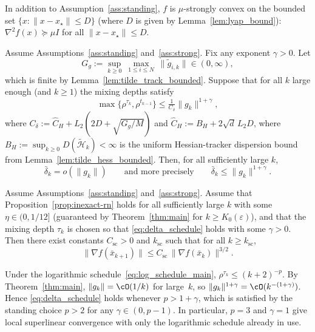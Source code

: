 \documentclass[review,onefignum,onetabnum]{siamart171218}
\begin{document}
\begin{assumption}\label{ass:strong}
In addition to Assumption~\ref{ass:standing}, $f$ is $\mu$-strongly convex on the bounded set
$\{x:\|x-x_\star\|\le D\}$ (where $D$ is given by Lemma~\ref{lem:lyap_bound}):
$\nabla^2 f(x)\succeq \mu I$ for all $\|x-x_\star\|\le D$.
\end{assumption}

\begin{lemma}\label{lem:delta_o_g}
Assume Assumptions~\ref{ass:standing} and~\ref{ass:strong}.
Fix any exponent $\gamma>0$.
Let
\[
G_g:=\sup_{k\ge 0}\ \max_{1\le i\le N}\ \|\tilde g_{i,k}\|\in(0,\infty),
\]
which is finite by Lemma~\ref{lem:tilde_track_bounded}.
Suppose that for all $k$ large enough (and $k\ge 1$) the mixing depths satisfy
\begin{equation}\label{eq:delta_schedule}
\max\{\rho^{\tau_k},\rho^{t_{k-1}}\}\le \tfrac{1}{C_\delta}\|g_k\|^{1+\gamma},
\end{equation}
where $C_\delta:=\hat C_H+L_2(2D+\sqrt{G_g/M})$ and $\hat C_H:=B_H+2\sqrt{d}\,L_2D$,
where $B_H:=\sup_{k\ge0}D(\tilde{\mathcal H}_k)<\infty$
is the uniform Hessian-tracker dispersion bound from Lemma~\ref{lem:tilde_hess_bounded}.
Then, for all sufficiently large $k$,
\[
\bar\delta_k = o(\|g_k\|)\qquad\text{and more precisely}\qquad \bar\delta_k\le \|g_k\|^{1+\gamma}.
\]
\end{lemma}

\begin{theorem}\label{thm:superlinear}
Assume Assumptions~\ref{ass:standing} and~\ref{ass:strong}.
Assume that Proposition~\ref{prop:inexact-rn} holds for all sufficiently large $k$ with some $\eta\in(0,1/12]$
(guaranteed by Theorem~\ref{thm:main} for $k\ge K_0(\varepsilon)$),
and that the mixing depth $\tau_k$ is chosen so that \eqref{eq:delta_schedule} holds with some $\gamma>0$.
Then there exist constants $C_{\mathrm{sc}}>0$ and $k_{\mathrm{sc}}$ such that for all $k\ge k_{\mathrm{sc}}$,
\[
\|\nabla f(\bar x_{k+1})\|\le C_{\mathrm{sc}}\,\|\nabla f(\bar x_k)\|^{3/2}.
\]
\end{theorem}

\begin{remark}
Under the logarithmic schedule~\eqref{eq:log_schedule_main},
$\rho^{\tau_k}\le(k+2)^{-p}$.
By Theorem~\ref{thm:main}, $\|g_k\|=\cO(1/k)$ for large~$k$, so
$\|g_k\|^{1+\gamma}=\cO(k^{-(1+\gamma)})$.
Hence \eqref{eq:delta_schedule} holds whenever $p>1+\gamma$,
which is satisfied by the standing choice $p>2$ for any
$\gamma\in(0,p{-}1)$.
In particular, $p=3$ and $\gamma=1$ give local superlinear
convergence with only the logarithmic schedule already in use.
\end{remark}
\end{document}

